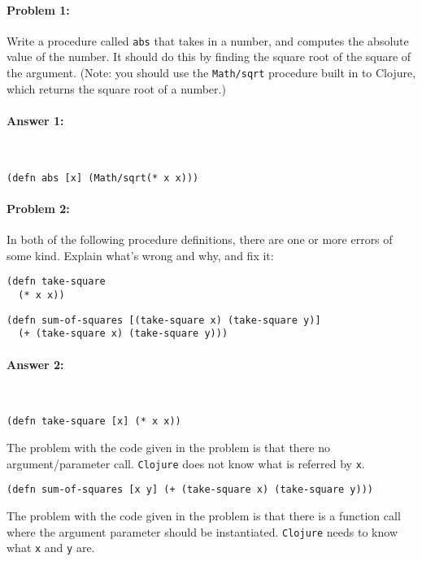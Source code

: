 \documentclass[12pt, letterpaper]{article}
\begin{document}
\pagestyle{fancy}

\paragraph{Problem 1:}
Write a procedure called \texttt{abs} that takes in a number, and
computes the absolute value of the number. It should do this by
finding the square root of the square of the argument. (Note: you
should use the \texttt{Math/sqrt} procedure built in to Clojure, which
returns the square root of a number.)

\paragraph{Answer 1:}~ 
\begin{lstlisting}
(defn abs [x] (Math/sqrt(* x x)))
\end{lstlisting}

\hrulefill
\paragraph{Problem 2:}
In both of the following procedure definitions, there are one or more errors of
some kind. Explain what's wrong and why, and fix it:

\begin{lstlisting}
(defn take-square
  (* x x))
\end{lstlisting}

\begin{lstlisting}
(defn sum-of-squares [(take-square x) (take-square y)]
  (+ (take-square x) (take-square y)))
\end{lstlisting}

\paragraph{Answer 2:}~\begin{lstlisting}
(defn take-square [x] (* x x))
\end{lstlisting}
The problem with the code given in the problem is that there no argument/parameter call. \texttt{Clojure} does not know what is referred by \texttt{x}.
\begin{lstlisting}
(defn sum-of-squares [x y] (+ (take-square x) (take-square y)))
\end{lstlisting}
The problem with the code given in the problem is that there is a function call where the argument parameter should be instantiated. \texttt{Clojure} needs to know what \texttt{x} and \texttt{y} are.
\end{document}
